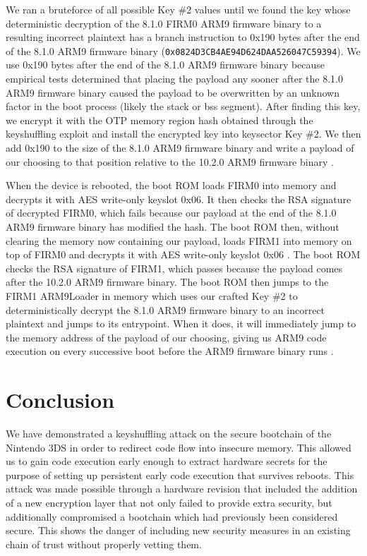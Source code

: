 \documentclass[journal]{IEEEtran}
\begin{document}
We ran a bruteforce of all possible Key \#2 values until we found the key whose
deterministic decryption of the 8.1.0 FIRM0 ARM9 firmware binary to a resulting
incorrect plaintext has a branch instruction to 0x190 bytes after the end of the
8.1.0 ARM9 firmware binary (\texttt{0x0824D3CB4AE94D624DAA526047C59394}). We use
0x190 bytes after the end of the 8.1.0 ARM9 firmware binary because empirical
tests determined that placing the payload any sooner after the 8.1.0 ARM9
firmware binary caused the payload to be overwritten by an unknown factor in the
boot process (likely the stack or bss segment). After finding this key, we
encrypt it with the OTP memory region hash obtained through the keyshuffling
exploit and install the encrypted key into keysector Key \#2. We then add 0x190
to the size of the 8.1.0 ARM9 firmware binary and write a payload of our
choosing to that position relative to the 10.2.0 ARM9 firmware binary
\cite{32c3}.

When the device is rebooted, the boot ROM loads FIRM0 into memory and decrypts
it with AES write-only keyslot 0x06. It then checks the RSA signature of
decrypted FIRM0, which fails because our payload at the end of the 8.1.0 ARM9
firmware binary has modified the hash. The boot ROM then, without clearing the
memory now containing our payload, loads FIRM1 into memory on top of FIRM0 and
decrypts it with AES write-only keyslot 0x06 \cite{clevermind}. The boot ROM
checks the RSA signature of FIRM1, which passes because the payload comes after
the 10.2.0 ARM9 firmware binary. The boot ROM then jumps to the FIRM1 ARM9Loader
in memory which uses our crafted Key \#2 to deterministically decrypt the 8.1.0
ARM9 firmware binary to an incorrect plaintext and jumps to its entrypoint. When
it does, it will immediately jump to the memory address of the payload of our
choosing, giving us ARM9 code execution on every successive boot before the ARM9
firmware binary runs \cite{32c3}\cite{clevermind}.

\section{Conclusion}

We have demonstrated a keyshuffling attack on the secure bootchain of the
Nintendo 3DS in order to redirect code flow into insecure memory. This allowed
us to gain code execution early enough to extract hardware secrets for the
purpose of setting up persistent early code execution that survives reboots.
This attack was made possible through a hardware revision that included the
addition of a new encryption layer that not only failed to provide extra
security, but additionally compromised a bootchain which had previously been
considered secure. This shows the danger of including new security measures in
an existing chain of trust without properly vetting them.
\end{document}

